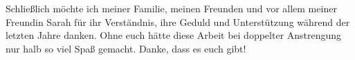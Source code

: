 \vspace{\baselineskip}

\foreignlanguage{ngerman}{Schließlich möchte ich meiner Familie, meinen Freunden und vor allem meiner Freundin Sarah für ihr Verständnis, ihre Geduld und Unterstützung während der letzten Jahre danken. Ohne euch hätte diese Arbeit bei doppelter Anstrengung nur halb so viel Spaß gemacht. Danke, dass es euch gibt!}